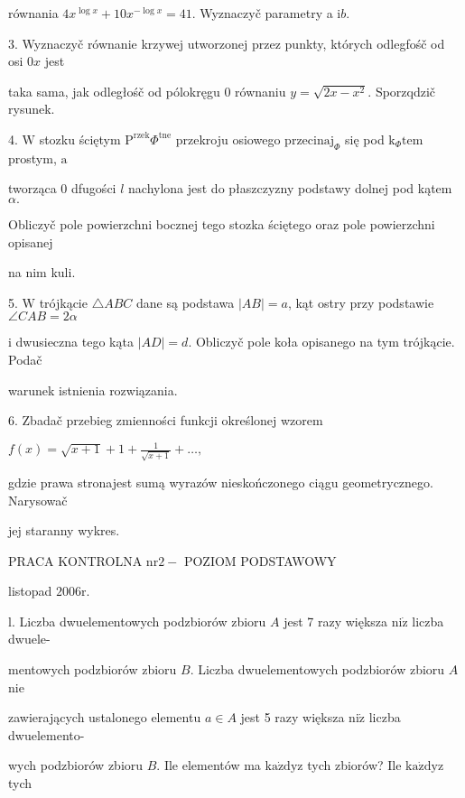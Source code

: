 \documentclass[a4paper,12pt]{article}
\begin{document}
równania $4x^{\log x}+10x^{-\log x}=41$. Wyznaczyč parametry a $\mathrm{i}b.$

3. Wyznaczyč równanie krzywej utworzonej przez punkty, których odlegfośč od osi $0x$ jest

taka sama, jak odległośč od pólokręgu $0$ równaniu $y=\sqrt{2x-x^{2}}$. Sporzqdzič rysunek.

4. $\mathrm{W}$ stozku ściętym $\mathrm{P}^{\mathrm{r}\mathrm{z}\mathrm{e}\mathrm{k}}\Phi^{\mathrm{t}\mathrm{n}\mathrm{e}}$ przekroju osiowego $\mathrm{p}\mathrm{r}\mathrm{z}\mathrm{e}\mathrm{c}\mathrm{i}\mathrm{n}\mathrm{a}\mathrm{j}_{\Phi}$ się pod $\mathrm{k}_{\Phi}\mathrm{t}\mathrm{e}\mathrm{m}$ prostym, $\mathrm{a}$

tworząca $0$ dfugości $l$ nachylona jest do płaszczyzny podstawy dolnej pod kątem $\alpha.$

Obliczyč pole powierzchni bocznej tego stozka ściętego oraz pole powierzchni opisanej

na nim kuli.

5. $\mathrm{W}$ trójkącie $\triangle ABC$ dane są podstawa $|AB|=a$, kąt ostry przy podstawie $\angle CAB=2\alpha$

$\mathrm{i}$ dwusieczna tego kąta $|AD|=d$. Obliczyč pole koła opisanego na tym trójkącie. Podač

warunek istnienia rozwiązania.

6. Zbadač przebieg zmienności funkcji określonej wzorem

$f(x)=\displaystyle \sqrt{x+1}+1+\frac{1}{\sqrt{x+1}}+\ldots,$

gdzie prawa stronajest sumą wyrazów nieskończonego ciągu geometrycznego. Narysowač

jej staranny wykres.





PRACA KONTROLNA $\mathrm{n}\mathrm{r}2-$ POZIOM PODSTAWOWY

listopad $2006\mathrm{r}.$

l. Liczba dwuelementowych podzbiorów zbioru $A$ jest 7 razy większa $\mathrm{n}\mathrm{i}\dot{\mathrm{z}}$ liczba dwuele-

mentowych podzbiorów zbioru $B$. Liczba dwuelementowych podzbiorów zbioru $A$ nie

zawierających ustalonego elementu $a\in A$ jest 5 razy większa $\mathrm{n}\mathrm{i}\dot{\mathrm{z}}$ liczba dwuelemento-

wych podzbiorów zbioru $B$. Ile elementów ma $\mathrm{k}\mathrm{a}\dot{\mathrm{z}}\mathrm{d}\mathrm{y}\mathrm{z}$ tych zbiorów? Ile $\mathrm{k}\mathrm{a}\dot{\mathrm{z}}\mathrm{d}\mathrm{y}\mathrm{z}$ tych
\end{document}
